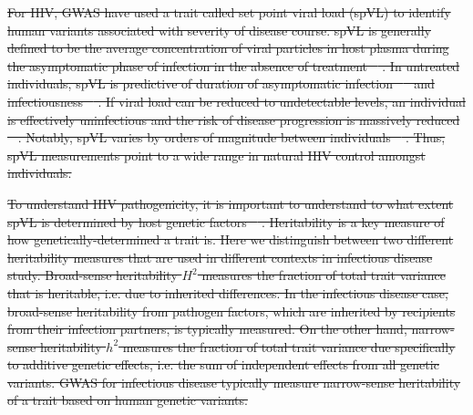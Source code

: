 \documentclass[11pt]{article} %
\providecommand{\DIFdel}[1]{{\protect\color{red}\sout{#1}}}                      %
\providecommand{\DIFdelbegin}{} %
\newcommand{\DIFscaledelfig}{0.5}
\newlength{\DIFdelgraphicswidth} %
\newlength{\DIFdelgraphicsheight} %
\newcommand{\DIFdelincludegraphics}[2][]{%
\sbox{\DIFdelgraphicsbox}{\DIFOincludegraphics[#1]{#2}}%
\settoboxwidth{\DIFdelgraphicswidth}{\DIFdelgraphicsbox} %
\settoboxtotalheight{\DIFdelgraphicsheight}{\DIFdelgraphicsbox} %
\scalebox{\DIFscaledelfig}{%
\parbox[b]{\DIFdelgraphicswidth}{\usebox{\DIFdelgraphicsbox}\\[-\baselineskip] \rule{\DIFdelgraphicswidth}{0em}}\llap{\resizebox{\DIFdelgraphicswidth}{\DIFdelgraphicsheight}{%
\setlength{\unitlength}{\DIFdelgraphicswidth}%
\begin{picture}(1,1)%
\thicklines\linethickness{2pt} %
{\color[rgb]{1,0,0}\put(0,0){\framebox(1,1){}}}%
{\color[rgb]{1,0,0}\put(0,0){\line( 1,1){1}}}%
{\color[rgb]{1,0,0}\put(0,1){\line(1,-1){1}}}%
\end{picture}%
}\hspace*{3pt}}} %
} %
\DeclareRobustCommand{\DIFdelbegin}{\DIFOdelbegin \let\includegraphics\DIFdelincludegraphics} %
\begin{document}
\begin{linenumbers}
\DIFdelbegin \DIFdel{For HIV, GWAS have used a trait called set point viral load (spVL) to identify human variants associated with severity of disease course. spVL is generally defined to be the average concentration of viral particles in host plasma during the asymptomatic phase of infection in the absence of treatment \mbox{%
\citep{Mellors1996}}\hskip0pt%
. In untreated individuals, spVL is predictive of duration of asymptomatic infection \mbox{%
\citep{Mellors1996} }\hskip0pt%
and infectiousness \mbox{%
\citep{Quinn2000}}\hskip0pt%
. If viral load can be reduced to undetectable levels, an individual is effectively uninfectious and the risk of disease progression is massively reduced \mbox{%
\citep{HHSARTGuidelines2019}}\hskip0pt%
. Notably, spVL varies by orders of magnitude between individuals \mbox{%
\citep{Mellors1996}}\hskip0pt%
. Thus, spVL measurements point to a wide range in natural HIV control amongst individuals. 
}%

\DIFdel{To understand HIV pathogenicity, it is important to understand to what extent spVL is determined by host genetic factors \mbox{%
\citep{Bartha2013, Dalmasso2008, Fellay2007, Pereyra2010, Fellay2009, Pelak2010, VanManen2011, McLaren2012}}\hskip0pt%
. Heritability is a key measure of how genetically-determined a trait is. Here we distinguish between two different heritability measures that are used in different contexts in infectious disease study. Broad-sense heritability $H^2$ measures the fraction of total trait variance that is heritable, i.e. due to inherited differences. In the infectious disease case, broad-sense heritability from pathogen factors, which are inherited by recipients from their infection partners, is typically measured. On the other hand, narrow-sense heritability $h^2$ measures the fraction of total trait variance due specifically to additive genetic effects, i.e. the sum of independent effects from all genetic variants. GWAS for infectious disease typically measure narrow-sense heritability of a trait based on human genetic variants.
}%


\end{linenumbers}
\end{document}

